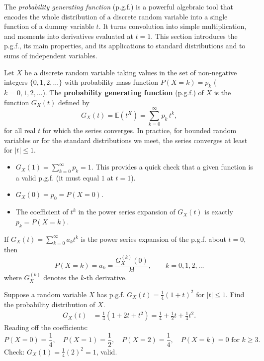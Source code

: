\documentclass[11pt]{article}
\newcounter{popsec}
\newcounter{popsub}
\newcommand{\courssub}[1]{%
  \stepcounter{popsub}%
  \par\vspace{9pt}\noindent{\popxbold\fontsize{11.5}{13}\selectfont\color{popink}{\color{poporange}\thepopsec.\thepopsub}\hspace{6pt}#1}\par\nopagebreak\vspace{4pt}
}
\begin{document}
The \emph{probability generating function} (p.g.f.) is a powerful algebraic tool that encodes the whole distribution of a discrete random variable into a single function of a dummy variable $t$. It turns convolution into simple multiplication, and moments into derivatives evaluated at $t=1$. This section introduces the p.g.f., its main properties, and its applications to standard distributions and to sums of independent variables.

\courssub{Definition and first properties}

\begin{definition}
Let $X$ be a discrete random variable taking values in the set of non‑negative integers $\{0,1,2,\dots\}$ with probability mass function $P(X=k)=p_k$ ($k=0,1,2,\dots$). The \textbf{probability generating function} (p.g.f.) of $X$ is the function $G_X(t)$ defined by
\[
G_X(t) = \mathbb{E}(t^X) = \sum_{k=0}^{\infty} p_k\, t^k,
\]
for all real $t$ for which the series converges. In practice, for bounded random variables or for the standard distributions we meet, the series converges at least for $|t|\le 1$.
\end{definition}

\begin{aretenir}
\begin{itemize}
\item $G_X(1) = \sum_{k=0}^\infty p_k = 1$. This provides a quick check that a given function is a valid p.g.f. (it must equal $1$ at $t=1$).
\item $G_X(0) = p_0 = P(X=0)$.
\item The coefficient of $t^k$ in the power series expansion of $G_X(t)$ is exactly $p_k = P(X=k)$.
\end{itemize}
\end{aretenir}

\begin{propriete}
If $G_X(t) = \sum_{k=0}^\infty a_k t^k$ is the power series expansion of the p.g.f. about $t=0$, then
\[
P(X=k) = a_k = \frac{G_X^{(k)}(0)}{k!}, \qquad k=0,1,2,\dots
\]
where $G_X^{(k)}$ denotes the $k$-th derivative.
\end{propriete}

\begin{exemplebox}
Suppose a random variable $X$ has p.g.f. $G_X(t) = \frac{1}{4}(1+t)^2$ for $|t|\le 1$. Find the probability distribution of $X$.
\begin{align*}
G_X(t) &= \frac{1}{4}(1 + 2t + t^2) = \frac{1}{4} + \frac{1}{2}t + \frac{1}{4}t^2.
\end{align*}
Reading off the coefficients:
\[
P(X=0)=\frac{1}{4},\quad P(X=1)=\frac{1}{2},\quad P(X=2)=\frac{1}{4},\quad P(X=k)=0 \text{ for } k\ge 3.
\]
Check: $G_X(1)=\frac{1}{4}(2)^2=1$, valid.
\end{exemplebox}
\end{document}
